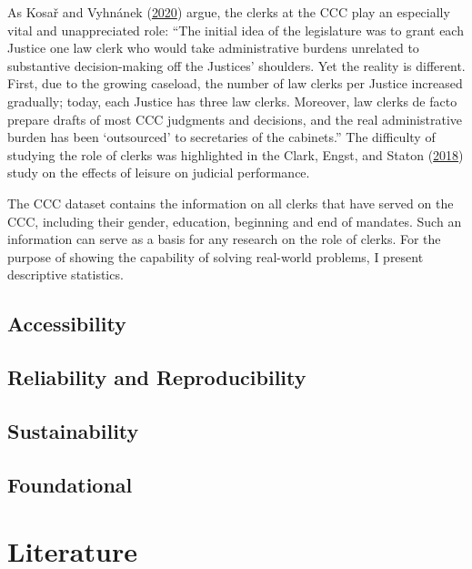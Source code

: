 \documentclass[
  11pt,
]{article}
\begin{document}
As Kosař and Vyhnánek
(\protect\hyperlink{ref-kosarConstitutionalCourtCzechia2020}{2020})
argue, the clerks at the CCC play an especially vital and unappreciated
role: ``The initial idea of the legislature was to grant each Justice
one law clerk who would take administrative burdens unrelated to
substantive decision-making off the Justices' shoulders. Yet the reality
is different. First, due to the growing caseload, the number of law
clerks per Justice increased gradually; today, each Justice has three
law clerks. Moreover, law clerks de facto prepare drafts of most CCC
judgments and decisions, and the real administrative burden has been
`outsourced' to secretaries of the cabinets.'' The difficulty of
studying the role of clerks was highlighted in the Clark, Engst, and
Staton (\protect\hyperlink{ref-clarkEstimatingEffectLeisure2018}{2018})
study on the effects of leisure on judicial performance.

The CCC dataset contains the information on all clerks that have served
on the CCC, including their gender, education, beginning and end of
mandates. Such an information can serve as a basis for any research on
the role of clerks. For the purpose of showing the capability of solving
real-world problems, I present descriptive statistics.

\hypertarget{accessibility}{%
\subsection{Accessibility}\label{accessibility}}

\hypertarget{reliability-and-reproducibility}{%
\subsection{Reliability and
Reproducibility}\label{reliability-and-reproducibility}}

\hypertarget{sustainability}{%
\subsection{Sustainability}\label{sustainability}}

\hypertarget{foundational}{%
\subsection{Foundational}\label{foundational}}

\vspace{30pt}

\hypertarget{literature}{%
\section*{Literature}\label{literature}}
\end{document}
